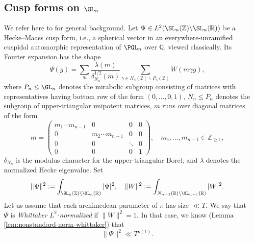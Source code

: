\subsection{Cusp forms on $\GL_n$}\label{sec:simpler-cusp-forms-gl_n}
We refer here to \cite{MR3468028} for general background.  Let $\Psi \in L^2(\SL_n(\mathbb{Z}) \backslash \SL_n(\mathbb{R}))$ be a Hecke--Maass cusp form, i.e., a spherical vector in an everywhere-unramified cuspidal automorphic representation of $\PGL_n$ over $\mathbb{Q}$, viewed classically.  Its Fourier expansion has the shape
\begin{equation*}
  \Psi(g) = \sum_{m}
  \frac{\lambda (m)}{\delta_{N_n}^{1/2}(m)}
  \sum_{\gamma \in N_n(\mathbb{Z}) \backslash P_n(\mathbb{Z})}
  W(m \gamma g),
\end{equation*}
where $P_n \leq \GL_n$ denotes the mirabolic subgroup consisting of matrices with representatives having bottom row of the form $(0,\dotsc,0,1)$,  $N_n \leq P_n$ denotes the subgroup of upper-triangular unipotent matrices, $m$ runs over diagonal matrices of the form
\begin{equation*}
  m =
  \begin{pmatrix}
    m_1 \dotsb m_{n-1} & 0 & 0 & 0 \\
    0 & m_2 \dotsb m_{n-1} & 0 & 0 \\
    0 & 0 & \ddots & 0 \\
    0 & 0 & 0 & 1
  \end{pmatrix},
  \quad
  m_1, \dotsc, m_{n-1} \in \mathbb{Z}_{\geq 1},
\end{equation*}
$\delta_{N_n}$ is the modulus character for the upper-triangular Borel, and $\lambda$ denotes the normalized Hecke eigenvalue.  Set
\begin{equation*}
  \|\Psi \|^2 := \int_{\SL_n(\mathbb{Z}) \backslash \SL_n(\mathbb{R})} |\Psi|^2,
  \quad
  \|W\|^2 := \int_{N_{n-1}(\mathbb{R}) \backslash \GL_{n-1}(\mathbb{R})} |W|^2.
\end{equation*}
Let us assume that each archimedean parameter of $\pi$ has size $\ll T$.  We say that $\Psi$ is \emph{Whittaker $L^2$-normalized} if $\|W\|^2 = 1$.  In that case, we know (Lemma \ref{lem:nonstandard-norm-whittaker}) that
\begin{equation}\label{eq:psi-2-ll}
  \|\Psi \|^2 \ll T^{o(1)}.
\end{equation}

